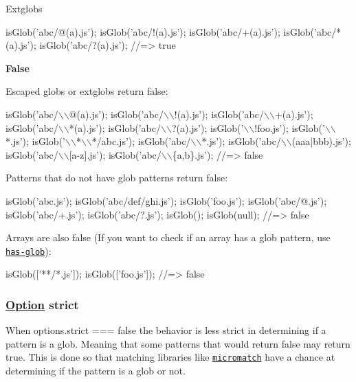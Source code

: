 Extglobs


\begin{DoxyCode}
isGlob('abc/@(a).js');
isGlob('abc/!(a).js');
isGlob('abc/+(a).js');
isGlob('abc/*(a).js');
isGlob('abc/?(a).js');
//=> true
\end{DoxyCode}


{\bfseries False}

Escaped globs or extglobs return {\ttfamily false}\+:


\begin{DoxyCode}
isGlob('abc/\(\backslash\)\(\backslash\)@(a).js');
isGlob('abc/\(\backslash\)\(\backslash\)!(a).js');
isGlob('abc/\(\backslash\)\(\backslash\)+(a).js');
isGlob('abc/\(\backslash\)\(\backslash\)*(a).js');
isGlob('abc/\(\backslash\)\(\backslash\)?(a).js');
isGlob('\(\backslash\)\(\backslash\)!foo.js');
isGlob('\(\backslash\)\(\backslash\)*.js');
isGlob('\(\backslash\)\(\backslash\)*\(\backslash\)\(\backslash\)*/abc.js');
isGlob('abc/\(\backslash\)\(\backslash\)*.js');
isGlob('abc/\(\backslash\)\(\backslash\)(aaa|bbb).js');
isGlob('abc/\(\backslash\)\(\backslash\)[a-z].js');
isGlob('abc/\(\backslash\)\(\backslash\)\{a,b\}.js');
//=> false
\end{DoxyCode}


Patterns that do not have glob patterns return {\ttfamily false}\+:


\begin{DoxyCode}
isGlob('abc.js');
isGlob('abc/def/ghi.js');
isGlob('foo.js');
isGlob('abc/@.js');
isGlob('abc/+.js');
isGlob('abc/?.js');
isGlob();
isGlob(null);
//=> false
\end{DoxyCode}


Arrays are also {\ttfamily false} (If you want to check if an array has a glob pattern, use \href{https://github.com/jonschlinkert/has-glob}{\tt has-\/glob})\+:


\begin{DoxyCode}
isGlob(['**/*.js']);
isGlob(['foo.js']);
//=> false
\end{DoxyCode}


\subsubsection*{\mbox{\hyperlink{structOption}{Option}} strict}

When {\ttfamily options.\+strict === false} the behavior is less strict in determining if a pattern is a glob. Meaning that some patterns that would return {\ttfamily false} may return {\ttfamily true}. This is done so that matching libraries like \href{https://github.com/micromatch/micromatch}{\tt micromatch} have a chance at determining if the pattern is a glob or not.


